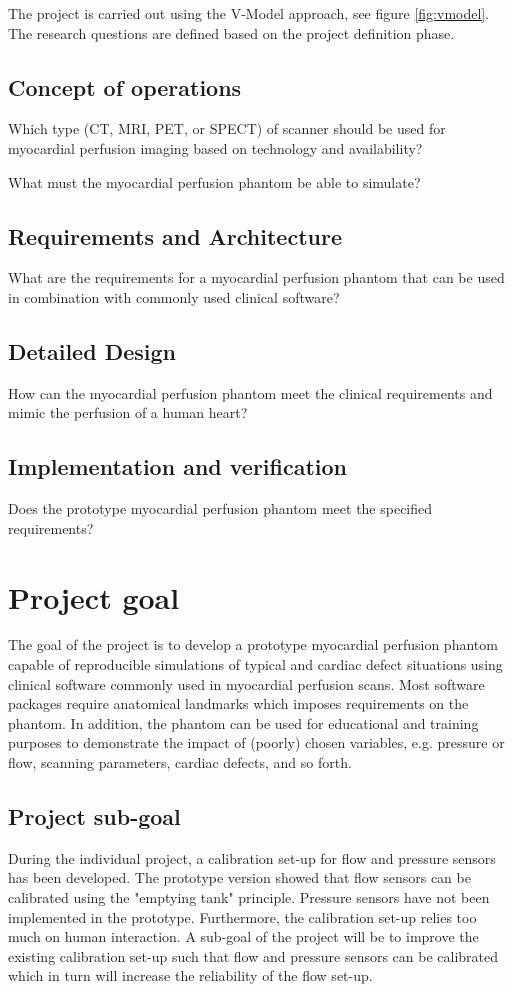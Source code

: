 The project is carried out using the V-Model \citep{rook1986controlling,osborne2005clarus} approach, see figure \ref{fig:vmodel}. The research questions are defined based on the project definition phase.

\subsection{Concept of operations}
Which type (CT, MRI, PET, or SPECT) of scanner should be used for myocardial perfusion imaging based on technology and availability?

What must the myocardial perfusion phantom be able to simulate?

\subsection{Requirements and Architecture}
What are the requirements for a myocardial perfusion phantom that can be used in combination with commonly used clinical software?

\subsection{Detailed Design}
How can the myocardial perfusion phantom meet the clinical requirements and mimic the perfusion of a human heart?

\subsection{Implementation and verification}
Does the prototype myocardial perfusion phantom meet the specified requirements? 

\section{Project goal}
The goal of the project is to develop a prototype myocardial perfusion phantom capable of reproducible simulations of typical and cardiac defect situations using clinical software commonly used in myocardial perfusion scans. Most software packages require anatomical landmarks which imposes requirements on the phantom. In addition, the phantom can be used for educational and training purposes to demonstrate the impact of (poorly) chosen variables, e.g. pressure or flow, scanning parameters, cardiac defects, and so forth.

\subsection*{Project sub-goal}
During the individual project, a calibration set-up for flow and pressure sensors has been developed. The prototype version showed that flow sensors can be calibrated using the "emptying tank" principle. Pressure sensors have not been implemented in the prototype. Furthermore, the calibration set-up relies too much on human interaction. A sub-goal of the project will be to improve the existing calibration set-up such that flow and pressure sensors can be calibrated which in turn will increase the reliability of the flow set-up.


